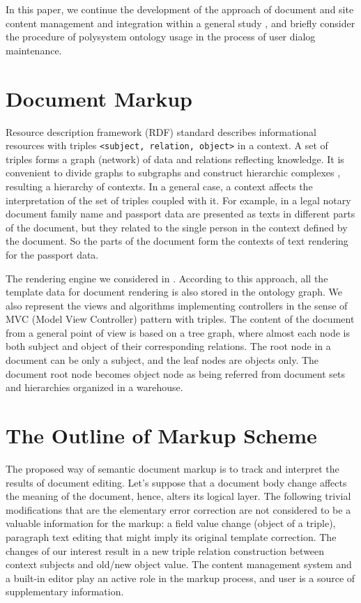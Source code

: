 \documentclass[conference]{IEEEtran}
\begin{document}
In this paper, we continue the development of the approach
\cite{prevwork} of document and site content management and
integration within a general study \cite{b2:15}, and briefly consider
the procedure of polysystem ontology usage in the process of user
dialog maintenance.

\section{Document Markup}

Resource description framework (RDF) standard describes informational
resources with triples \texttt{<subject, relation, object>} in a
context.  A set of triples forms a graph (network) of data and
relations reflecting knowledge.  It is convenient to divide graphs to
subgraphs and construct hierarchic complexes \cite{b2:15}, resulting a
hierarchy of contexts.  In a general case, a context affects the
interpretation of the set of triples coupled with it.  For example, in
a legal notary document family name and passport data are presented as
texts in different parts of the document, but they related to the
single person in the context defined by the document.  So the parts of
the document form the contexts of text rendering for the passport
data.

The rendering engine we considered in \cite{prevwork}.  According to this approach, all the template data for document rendering is also stored in the ontology graph.  We also represent the views and algorithms implementing controllers in the sense of MVC (Model View Controller) \cite{b2:5} pattern with triples.  The content of the document from a general point of view is based on a tree graph, where almost each node is both subject and object of their corresponding relations.  The root node in a document can be only a subject, and the leaf nodes are objects only.  The document root node becomes object node as being referred from document sets and hierarchies organized in a warehouse.

\section{The Outline of Markup Scheme}
\label{sec:scheme}

The proposed way of semantic document markup is to track and interpret the results of document editing.  Let's suppose that a document body change affects the meaning of the document, hence, alters its logical layer.  The following trivial modifications that are the elementary error correction are not considered to be a valuable information for the markup: a field value change (object of a triple), paragraph text editing that might imply its original template correction.  The changes of our interest result in a new triple relation construction between context subjects and old/new object value.  The content management system and a built-in editor play an active role in the markup process, and user is a source of supplementary information.
\end{document}
